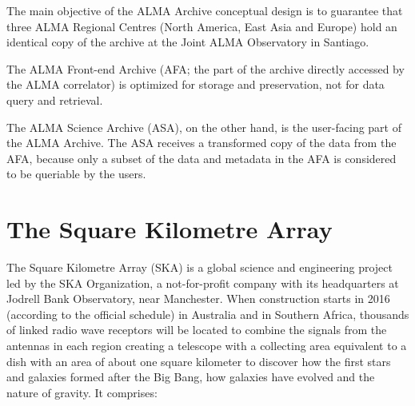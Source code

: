 The main objective of the
ALMA Archive
conceptual design
is to guarantee that three ALMA Regional Centres (North America,
East Asia %
and Europe) hold an identical copy of the archive at the Joint ALMA Observatory in Santiago. 

The
ALMA Front-end Archive
(AFA; the part of the archive directly accessed by the ALMA correlator)
is optimized for storage and preservation, not for data query and retrieval.

The ALMA Science Archive (ASA), on the other hand, is the user-facing part of the ALMA Archive. The ASA receives a transformed copy of the data from the AFA, because only a subset of the data and metadata in the AFA is considered to be queriable by the users.



\section{The Square Kilometre Array} %
\label{sec:the_square_kilometre_array}
The Square
Kilometre %
Array (SKA) %
is a global science and engineering project led by the SKA Organization, a not-for-profit company with its headquarters at Jodrell Bank Observatory, near Manchester. When construction starts in 2016 (according to
the official schedule) %
in Australia and in Southern Africa, thousands of linked radio wave receptors will be located to combine the signals from the antennas in each region creating a telescope with a collecting area equivalent to a dish with an area of about one square kilometer to discover how the first stars and galaxies formed after the Big Bang, how galaxies have evolved and the nature of gravity. It comprises:

